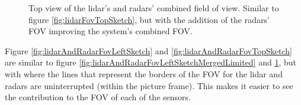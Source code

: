 \begin{figure}[H]
\begin{minipage}[b]{0.49\textwidth}
        \caption{Top view of the lidar's and radars' combined field of view. Similar to figure \ref{fig:lidarFovTopSketch}, but with the addition of the radars' FOV improving the system's combined FOV.}
        \label{fig:lidarAndRadarFovTopSketchMerged}
    \end{minipage}
\end{figure}

Figure \ref{fig:lidarAndRadarFovLeftSketch} and \ref{fig:lidarAndRadarFovTopSketch} are similar to figure \ref{fig:lidarAndRadarFovLeftSketchMergedLimited} and \ref{fig:lidarAndRadarFovTopSketchMerged}, but with where the lines that represent the borders of the FOV for the lidar and radars are uninterrupted (within the picture frame). This makes it easier to see the contribution to the FOV of each of the sensors. 

